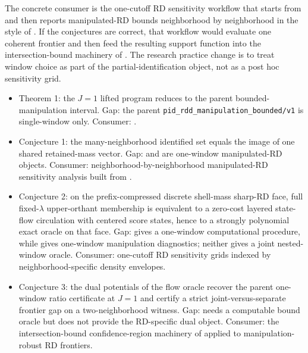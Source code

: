 \documentclass[11pt]{article}
\theoremstyle{definition}
\theoremstyle{plain}
\theoremstyle{remark}
\begin{document}
The concrete consumer is the one-cutoff RD sensitivity workflow that starts from
\citet[pp.~1450--1451]{cattaneo_jansson_ma_2020_density} and then reports manipulated-RD
bounds neighborhood by neighborhood in the style of \citet{gerard_rokkanen_rothe_2020_rdbounds}.
If the conjectures are correct, that workflow would evaluate one coherent frontier and then
feed the resulting support function into the intersection-bound machinery of
\citet[Sec.~3]{chernozhukov_lee_rosen_2013_intersection_bounds}. The research practice
change is to treat window choice as part of the partial-identification object, not as a post
hoc sensitivity grid.

\begin{itemize}[leftmargin=*]
  \item Theorem 1: the \(J=1\) lifted program reduces to the parent bounded-manipulation interval. Gap: the parent \texttt{pid\_rdd\_manipulation\_bounded/v1} is single-window only. Consumer: \citet{gerard_rokkanen_rothe_2020_rdbounds}.
  \item Conjecture 1: the many-neighborhood identified set equals the image of one shared retained-mass vector. Gap: \citet{gerard_rokkanen_rothe_2020_rdbounds} and \citet{rosenman_rajkumar_gauriot_slonim_2019_discrete_manipulation} are one-window manipulated-RD objects. Consumer: neighborhood-by-neighborhood manipulated-RD sensitivity analysis built from \citet{gerard_rokkanen_rothe_2020_rdbounds}.
  \item Conjecture 2: on the prefix-compressed discrete shell-mass sharp-RD face, full fixed-\(\lambda\) upper-orthant membership is equivalent to a zero-cost layered state-flow circulation with centered score states, hence to a strongly polynomial exact oracle on that face. Gap: \citet{rosenman_rajkumar_gauriot_slonim_2019_discrete_manipulation} gives a one-window computational procedure, while \citet{cattaneo_jansson_ma_2020_density} gives one-window manipulation diagnostics; neither gives a joint nested-window oracle. Consumer: one-cutoff RD sensitivity grids indexed by neighborhood-specific density envelopes.
  \item Conjecture 3: the dual potentials of the flow oracle recover the parent one-window ratio certificate at \(J=1\) and certify a strict joint-versus-separate frontier gap on a two-neighborhood witness. Gap: \citet[Abstract; p.~667]{chernozhukov_lee_rosen_2013_intersection_bounds} needs a computable bound oracle but does not provide the RD-specific dual object. Consumer: the intersection-bound confidence-region machinery of \citet[Sec.~3]{chernozhukov_lee_rosen_2013_intersection_bounds} applied to manipulation-robust RD frontiers.
\end{itemize}
\end{document}
